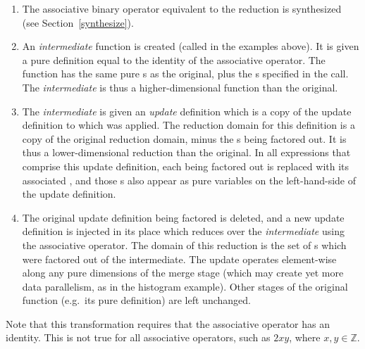 \begin{enumerate}
\item The associative binary operator equivalent to the reduction is synthesized (see Section~\ref{synthesize}).
\item An \emph{intermediate} function is created (called  in the examples above). It is given a pure definition equal to the identity of the associative operator. The function has the same pure s as the original, plus the s specified in the  call. The \emph{intermediate} is thus a higher-dimensional function than the original.
\item The \emph{intermediate} is given an \emph{update} definition which is a copy of the update definition to which  was applied. The reduction domain for this definition is a copy of the original reduction domain, minus the s being factored out. It is thus a lower-dimensional reduction than the original. In all expressions that comprise this update definition, each  being factored out is replaced with its associated , and those s also appear as pure variables on the left-hand-side of the update definition.
\item The original update definition being factored is deleted, and a new update definition is injected in its place which reduces over the \emph{intermediate} using the associative operator. The domain of this reduction is the set of s which were factored out of the intermediate. The update operates element-wise along any pure dimensions of the merge stage (which may create yet more data parallelism, as in the histogram example). Other stages of the original function (e.g.\ its pure definition) are left unchanged.
\end{enumerate}

Note that this transformation requires that the associative operator has an identity. This is not true for all associative operators, such as $2xy$, where $x, y \in \mathds{Z}$.
